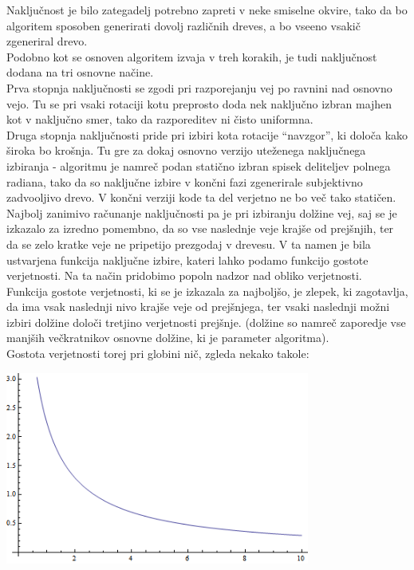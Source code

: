 \documentclass[10pt,a4paper,oneside]{book}
\def\pa{\\[-6pt]}
\begin{document}
Naključnost je bilo zategadelj potrebno zapreti v neke smiselne
okvire, tako da bo algoritem sposoben generirati dovolj različnih
dreves, a bo vseeno vsakič zgeneriral drevo.\pa

Podobno kot se osnoven algoritem izvaja v treh korakih, je tudi
naključnost dodana na tri osnovne načine.\pa

Prva stopnja naključnosti se zgodi pri razporejanju vej po ravnini nad
osnovno vejo. Tu se pri vsaki rotaciji kotu preprosto doda nek
naključno izbran majhen kot v naključno smer, tako da razporeditev ni
čisto uniformna.\pa

Druga stopnja naključnosti pride pri izbiri kota rotacije ``navzgor'',
ki določa kako široka bo krošnja. Tu gre za dokaj osnovno verzijo
uteženega naključnega izbiranja - algoritmu je namreč podan statično
izbran spisek deliteljev polnega radiana, tako da so naključne izbire
v končni fazi zgenerirale subjektivno zadvooljivo drevo. V končni
verziji kode ta del verjetno ne bo več tako statičen.\pa

Najbolj zanimivo računanje naključnosti pa je pri izbiranju dolžine
vej, saj se je izkazalo za izredno pomembno, da so vse naslednje veje
krajše od prejšnjih, ter da se zelo kratke veje ne pripetijo prezgodaj
v drevesu. V ta namen je bila ustvarjena funkcija naključne izbire,
kateri lahko podamo funkcijo gostote verjetnosti. Na ta način
pridobimo popoln nadzor nad obliko verjetnosti.\pa

Funkcija gostote verjetnosti, ki se je izkazala za najboljšo, je
zlepek, ki zagotavlja, da ima vsak naslednji nivo krajše veje od
prejšnjega, ter vsaki naslednji možni izbiri dolžine določi tretjino
verjetnosti prejšnje. (dolžine so namreč zaporedje vse manjših
večkratnikov osnovne dolžine, ki je parameter algoritma).\pa

Gostota verjetnosti torej pri globini nič, zgleda nekako takole:

\begin{center}
\includegraphics[width=10cm]{distribution.png}
\end{center}
\end{document}
